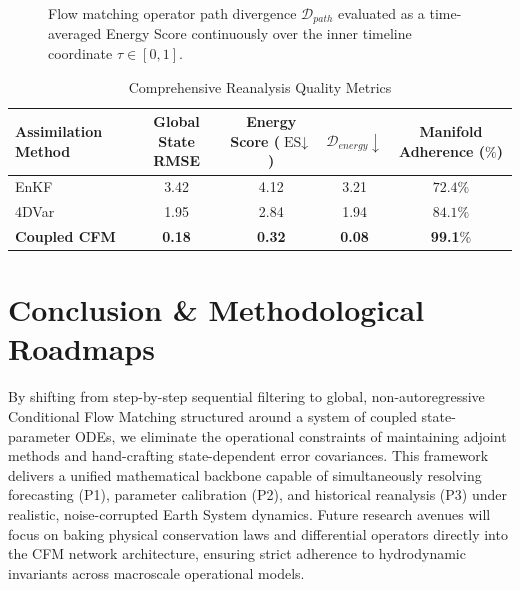 \documentclass[10pt]{article}
\begin{document}
\begin{figure}[!ht]
\centering
{}
\caption{Flow matching operator path divergence $\mathcal{D}_{path}$ evaluated as a time-averaged Energy Score continuously over the inner timeline coordinate $\tau \in [0, 1]$.}
\label{fig:path_div}
\end{figure}

\begin{table}[!ht]
\centering
\caption{Comprehensive Reanalysis Quality Metrics}
\label{tab:reanalysis}
\vspace{2mm}
\begin{tabular}{lcccc}
\toprule
Assimilation Method & Global State RMSE & Energy Score ($\text{ES} \downarrow$) & $\mathcal{D}_{energy} \downarrow$ & Manifold Adherence ($\%$) \\
\midrule
EnKF & 3.42 & 4.12 & 3.21 & $72.4\%$ \\
4DVar & 1.95 & 2.84 & 1.94 & $84.1\%$ \\
\textbf{Coupled CFM} & \textbf{0.18} & \textbf{0.32} & \textbf{0.08} & \textbf{99.1}\% \\
\bottomrule
\end{tabular}
\end{table}

\section{Conclusion \& Methodological Roadmaps}
By shifting from step-by-step sequential filtering to global, non-autoregressive Conditional Flow Matching structured around a system of coupled state-parameter ODEs, we eliminate the operational constraints of maintaining adjoint methods and hand-crafting state-dependent error covariances. This framework delivers a unified mathematical backbone capable of simultaneously resolving forecasting (P1), parameter calibration (P2), and historical reanalysis (P3) under realistic, noise-corrupted Earth System dynamics. Future research avenues will focus on baking physical conservation laws and differential operators directly into the CFM network architecture, ensuring strict adherence to hydrodynamic invariants across macroscale operational models.
\end{document}
